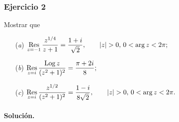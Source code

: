 \documentclass[a4paper]{report}
\DeclareMathOperator{\Log}{Log}
\def\Res{\qopname\relax m{Res}}
\begin{document}
\subsubsection*{Ejercicio 2}

Mostrar que
\begin{enumerate}
 \item[(\textit{a})] 
 \(\displaystyle\Res_{z=-1}\frac{z^{1/4}}{z+1}=\frac{1+i}{\sqrt{2}},\qquad
 |z|>0,\,0<\arg z<2\pi;\)
 \item[(\textit{b})] 
 \(\displaystyle\Res_{z=i}\frac{\Log z}{(z^2+1)^2}=\frac{\pi+2i}{8};\) 
 \item[(\textit{c})] 
 \(\displaystyle\Res_{z=i}\frac{z^{1/2}}{(z^2+1)^2}=\frac{1-i}{8\sqrt{2}},\qquad
 |z|>0,\,0<\arg z<2\pi.\)
\end{enumerate}

\paragraph{Solución.} 
\end{document}
